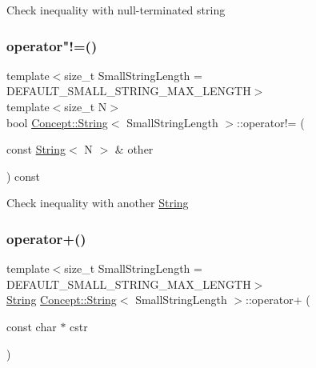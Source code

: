 Check inequality with null-\/terminated string \mbox{\label{class_concept_1_1_string_a5abc9c7cb95e50758c54aea8fb51c09a}} 
\subsubsection{\texorpdfstring{operator"!=()}{operator!=()}\hspace{0.1cm}{\footnotesize\ttfamily [2/2]}}
{\footnotesize\ttfamily template$<$size\+\_\+t Small\+String\+Length = D\+E\+F\+A\+U\+L\+T\+\_\+\+S\+M\+A\+L\+L\+\_\+\+S\+T\+R\+I\+N\+G\+\_\+\+M\+A\+X\+\_\+\+L\+E\+N\+G\+TH$>$ \\
template$<$size\+\_\+t N$>$ \\
bool \mbox{\hyperlink{class_concept_1_1_string}{Concept\+::\+String}}$<$ Small\+String\+Length $>$\+::operator!= (\begin{DoxyParamCaption}\item[{const \mbox{\hyperlink{class_concept_1_1_string}{String}}$<$ N $>$ \&}]{other }\end{DoxyParamCaption}) const\hspace{0.3cm}{\ttfamily [inline]}}

Check inequality with another \mbox{\hyperlink{class_concept_1_1_string}{String}} \mbox{\label{class_concept_1_1_string_ae6e294670372f2eeaa224d88f5f1a178}} 
\subsubsection{\texorpdfstring{operator+()}{operator+()}\hspace{0.1cm}{\footnotesize\ttfamily [1/2]}}
{\footnotesize\ttfamily template$<$size\+\_\+t Small\+String\+Length = D\+E\+F\+A\+U\+L\+T\+\_\+\+S\+M\+A\+L\+L\+\_\+\+S\+T\+R\+I\+N\+G\+\_\+\+M\+A\+X\+\_\+\+L\+E\+N\+G\+TH$>$ \\
\mbox{\hyperlink{class_concept_1_1_string}{String}} \mbox{\hyperlink{class_concept_1_1_string}{Concept\+::\+String}}$<$ Small\+String\+Length $>$\+::operator+ (\begin{DoxyParamCaption}\item[{const char $\ast$}]{cstr }\end{DoxyParamCaption})\hspace{0.3cm}{\ttfamily [inline]}}

